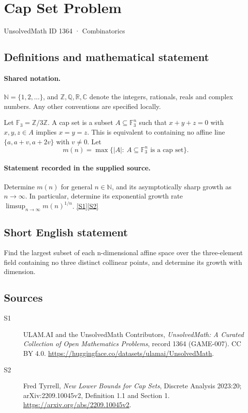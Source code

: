 \documentclass[11pt]{article}
\newcommand{\sref}[2]{\hyperlink{source:#1:#2}{[S#2]}}
\begin{document}
\setcounter{section}{1363}
\section{Cap Set Problem}\label{1364}
{\small\sffamily UnsolvedMath ID 1364 · Combinatorics}
\subsection{Definitions and mathematical statement}

\paragraph{Shared notation.}$\mathbb N=\{1,2,\ldots\}$, and $\mathbb Z,\mathbb Q,\mathbb R,\mathbb C$ denote the integers, rationals, reals and complex numbers. Any other conventions are specified locally.


Let $\mathbb F_3=\mathbb Z/3\mathbb Z$. A cap set is a subset $A\subseteq\mathbb F_3^n$ such that $x+y+z=0$ with $x,y,z\in A$ implies $x=y=z$. This is equivalent to containing no affine line $\{a,a+v,a+2v\}$ with $v\ne0$. Let
\[
 m(n)=\max\{|A|:\ A\subseteq\mathbb F_3^n\text{ is a cap set}\}.
\]
\paragraph{Statement recorded in the supplied source.}
Determine $m(n)$ for general $n\in\mathbb N$, and its asymptotically sharp growth as $n\to\infty$. In particular, determine its exponential growth rate $\limsup_{n\to\infty}m(n)^{1/n}$. \sref{1364}{1}\sref{1364}{2}
\subsection{Short English statement}
Find the largest subset of each n-dimensional affine space over the three-element field containing no three distinct collinear points, and determine its growth with dimension.
\subsection{Sources}
\begin{description}
\item[\hypertarget{source:1364:1}{S1}] ULAM.AI and the UnsolvedMath Contributors, \emph{UnsolvedMath: A Curated Collection of Open Mathematics Problems}, record 1364 (GAME-007). CC BY 4.0. \url{https://huggingface.co/datasets/ulamai/UnsolvedMath}.
\item[\hypertarget{source:1364:2}{S2}] Fred Tyrrell, \emph{New Lower Bounds for Cap Sets}, Discrete Analysis 2023:20; arXiv:2209.10045v2, Definition 1.1 and Section 1. \url{https://arxiv.org/abs/2209.10045v2}.
\end{description}
\label{end:1364}
\end{document}
